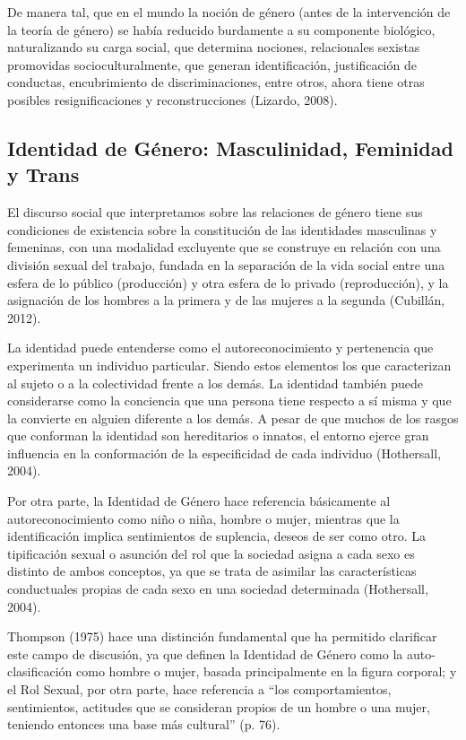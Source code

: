 De manera tal, que en el mundo la noción de género (antes de la intervención de
la teoría de género) se había reducido burdamente a su componente biológico,
naturalizando su carga social, que determina nociones, relacionales sexistas
promovidas socioculturalmente, que generan identificación, justificación de
conductas, encubrimiento de discriminaciones, entre otros, ahora tiene otras
posibles resignificaciones y reconstrucciones (Lizardo, 2008).

\subsection{Identidad de Género: Masculinidad, Feminidad y Trans}
El discurso social que interpretamos sobre las relaciones de género tiene sus
condiciones de existencia sobre la constitución de las identidades masculinas y
femeninas, con una modalidad excluyente que se construye en relación con una
división sexual del trabajo, fundada en la separación de la vida social entre
una esfera de lo público (producción) y otra esfera de lo privado
(reproducción), y la asignación de los hombres a la primera y de las mujeres a
la segunda (Cubillán, 2012).

La identidad puede entenderse como el autoreconocimiento y pertenencia que
experimenta un individuo particular.
Siendo estos elementos los que caracterizan al sujeto o a la colectividad frente
a los demás.
La identidad también puede considerarse como la conciencia que una persona tiene
respecto a sí misma y que la convierte en alguien diferente a los demás.
A pesar de que muchos de los rasgos que conforman la identidad son hereditarios
o innatos, el entorno ejerce gran influencia en la conformación de la
especificidad de cada individuo (Hothersall, 2004).

Por otra parte, la Identidad de Género hace referencia básicamente al
autoreconocimiento como niño o niña, hombre o mujer, mientras que la
identificación implica sentimientos de suplencia, deseos de ser como otro.
La tipificación sexual o asunción del rol que la sociedad asigna a cada sexo es
distinto de ambos conceptos, ya que se trata de asimilar las características
conductuales propias de cada sexo en una sociedad determinada (Hothersall,
2004).

Thompson (1975) hace una distinción fundamental que ha permitido clarificar este
campo de discusión, ya que definen la Identidad de Género como la
auto-clasificación como hombre o mujer, basada principalmente en la figura
corporal;
y el Rol Sexual, por otra parte, hace referencia a “los comportamientos,
sentimientos, actitudes que se consideran propios de un hombre
o una mujer, teniendo entonces una base más cultural” (p. 76).


